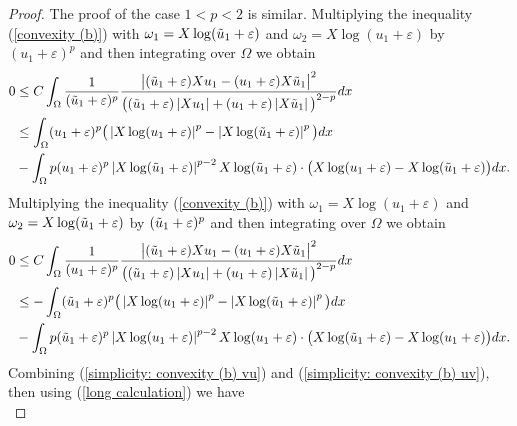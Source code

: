 \documentclass[a4paper,12pt,reqno]{amsart}
\renewcommand\eqref[1]{(\ref{#1})} %
\numberwithin{equation}{section}
\theoremstyle{plain}
\theoremstyle{definition}
\begin{document}
\begin{proof}
The proof of the case $1<p<2$ is similar. Multiplying the inequality \eqref{convexity (b)} with $\omega_{1}=X \log (\Tilde{u}_{1}+\varepsilon)$ and $\omega_{2}=X \log (u_{1}+\varepsilon)$ by $(u_{1}+\varepsilon)^p$ and then integrating over $\Omega$ we obtain
\begin{equation}\label{simplicity: convexity (b) vu}
\begin{aligned}
0  &\leq C \int_{\Omega}\frac{1}{(\Tilde{u}_{1}+\varepsilon)^{p}}\frac{\big|(\Tilde{u}_{1}+\varepsilon) X u_{1}-(u_{1}+\varepsilon) X \Tilde{u}_{1}\big|^{2}}{\big((\Tilde{u}_{1}+\varepsilon)\left|X u_{1}\right|+(u_{1}+\varepsilon)\left|X \Tilde{u}_{1}\right|\big)^{2-p}} d x  \\
& \leq \int_{\Omega}(u_{1}+\varepsilon)^{p}\big(\left|X \log (u_{1}+\varepsilon)\right|^{p}-\left|X \log (\Tilde{u}_{1}+\varepsilon)\right|^{p}\big) d x\\
&-\int_{\Omega} p (u_{1}+\varepsilon)^{p}\left|X \log (\Tilde{u}_{1}+\varepsilon)\right|^{p-2} X \log (\Tilde{u}_{1}+\varepsilon) \cdot\big(X \log (u_{1}+\varepsilon)-X \log (\Tilde{u}_{1}+\varepsilon)\big) d x.
\end{aligned}
\end{equation}
Multiplying the inequality \eqref{convexity (b)} with $\omega_{1}=X \log (u_{1}+\varepsilon)$ and $\omega_{2}=X \log (\Tilde{u}_{1}+\varepsilon)$ by $(\Tilde{u}_{1}+\varepsilon)^p$ and then integrating over $\Omega$ we obtain
\begin{equation}\label{simplicity: convexity (b) uv}
\begin{aligned}
0 & \leq C \int_{\Omega}\frac{1}{(u_{1}+\varepsilon)^{p}}\frac{\big|(\Tilde{u}_{1}+\varepsilon) X u_{1}-(u_{1}+\varepsilon) X \Tilde{u}_{1}\big|^{2}}{\big((\Tilde{u}_{1}+\varepsilon)\left|X u_{1}\right|+(u_{1}+\varepsilon)\left|X \Tilde{u}_{1}\right|\big)^{2-p}} d x \\
& \leq-\int_{\Omega}(\Tilde{u}_{1}+\varepsilon)^{p}\big(\left|X \log (u_{1}+\varepsilon)\right|^{p}-\left|X \log (\Tilde{u}_{1}+\varepsilon)\right|^{p}\big) d x\\
& -\int_{\Omega} p (\Tilde{u}_{1}+\varepsilon)^{p}\left|X \log (u_{1}+\varepsilon)\right|^{p-2} X \log (u_{1}+\varepsilon) \cdot\big(X \log (\Tilde{u}_{1}+\varepsilon)-X \log (u_{1}+\varepsilon)\big) d x.
\end{aligned}   
\end{equation}
Combining \eqref{simplicity: convexity (b) vu} and \eqref{simplicity: convexity (b) uv}, then using \eqref{long calculation} we have
\begin{equation}\label{simplicity 1<p<2}

\end{equation}
\end{proof}
\end{document}
